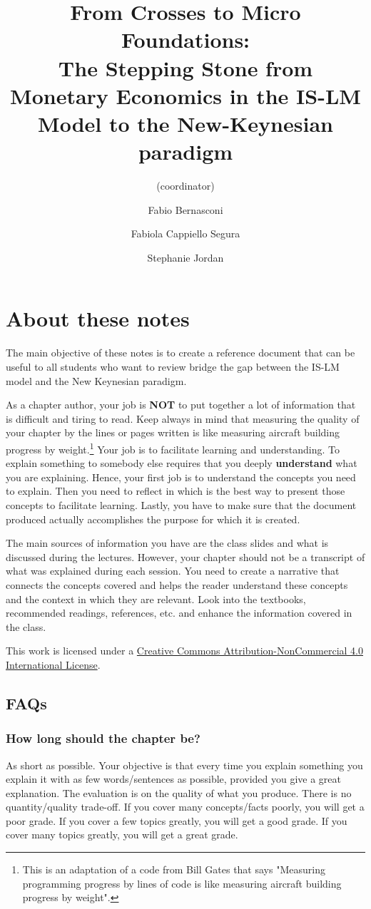\documentclass[11pt,a4paper,oneside]{book}
\title{From Crosses to Micro Foundations:\\
The Stepping Stone from Monetary Economics in the IS-LM Model to the New-Keynesian paradigm}
\author{
  (coordinator)
  \and
  Fabio Bernasconi
  \and
  Fabiola Cappiello Segura
  \and
  Stephanie Jordan
}
\begin{document}
\frontmatter
\maketitle

\chapter{About these notes}
The main objective of these notes is to create a reference document that can be useful to all students who want to review bridge the gap between the IS-LM model and the New Keynesian paradigm.

As a chapter author, your job is \textbf{NOT} to put together a lot of information that is difficult and tiring to read. Keep always in mind that measuring the quality of your chapter by the lines or pages written is like measuring aircraft building progress by weight.\footnote{This is an adaptation of a code from Bill Gates that says "Measuring programming progress by lines of code is like measuring aircraft building progress by weight".} Your job is to facilitate learning and understanding. To explain something to somebody else requires that you deeply \textbf{understand} what you are explaining. Hence, your first job is to understand the concepts you need to explain. Then you need to reflect in which is the best way to present those concepts to facilitate learning. Lastly, you have to make sure that the document produced actually accomplishes the purpose for which it is created.

The main sources of information you have are the class slides and what is discussed during the lectures. However, your chapter should not be a transcript of what was explained during each session. You need to create a narrative that connects the concepts covered and helps the reader understand these concepts and the context in which they are relevant. Look into the textbooks, recommended readings, references, etc. and enhance the information covered in the class.

This work is licensed under a \href{http://creativecommons.org/licenses/by-nc/4.0/}{Creative Commons Attribution-NonCommercial 4.0 International License}.

\newpage
\section*{FAQs}
\subsection*{How long should the chapter be?}
As short as possible. Your objective is that every time you explain something you explain it with as few words/sentences as possible, provided you give a great explanation. The evaluation is on the quality of what you produce. There is no quantity/quality trade-off. If you cover many concepts/facts poorly, you will get a poor grade. If you cover a few topics greatly, you will get a good grade. If you cover many topics greatly, you will get a great grade.
\end{document}
